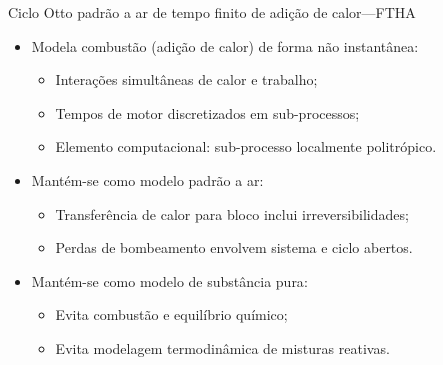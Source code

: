     \begin{frame}{Ciclo Otto padrão a ar de tempo finito de adição de calor---FTHA}\vspace*{-2em}
        \begin{itemize}
            \item<1->  Modela combustão (adição de calor) de forma \alert{não instantânea}:
            \begin{itemize}
                \item<2->  Interações \alert{simultâneas} de \alert{calor} e \alert{trabalho};
                \item<3->  Tempos de motor \alert{discretizados} em \alert{sub-processos};
                \item<4->  Elemento computacional: sub-processo \alert{localmente politrópico}.
            \end{itemize}
            \item<5->  Mantém-se como modelo \alert{padrão a ar}:
            \begin{itemize}
                \item<6->  Transferência de calor para bloco inclui \alert{irreversibilidades};
                \item<7->  Perdas de bombeamento envolvem \alert{sistema e ciclo abertos}.
            \end{itemize}
            \item<8->  Mantém-se como modelo de \alert{substância pura}:
            \begin{itemize}
                \item<9->  Evita \alert{combustão e equilíbrio químico};
                \item<10-> Evita modelagem termodinâmica de \alert{misturas reativas}.
            \end{itemize}
        \end{itemize}
    \end{frame}

